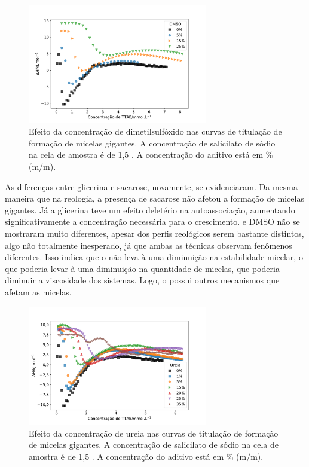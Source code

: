			\begin{figure}[h]
				\centering
				\includegraphics[width=0.7\textwidth]{imagens/itc/ITC_MG_dmso}
				\caption{Efeito da concentração de dimetilsulfóxido nas curvas de titulação de formação de micelas gigantes. A concentração de salicilato de sódio na cela de amostra é de 1,5 \mM. A concentração do aditivo está em \% (m/m).}
				\label{fig:itc_mg_dmso} 
			\end{figure}

			As diferenças entre glicerina e sacarose, novamente, se evidenciaram. Da mesma maneira que na reologia, a presença de sacarose não afetou a formação de micelas gigantes. Já a glicerina teve um efeito deletério na autoassociação, aumentando significativamente a concentração necessária para o crescimento. \BD{} e DMSO não se mostraram muito diferentes, apesar dos perfis reológicos serem bastante distintos, algo não totalmente inesperado, já que ambas as técnicas observam fenômenos diferentes. Isso indica que o \BD{} não leva à uma diminuição na estabilidade micelar, o que poderia levar à uma diminuição na quantidade de micelas, que poderia diminuir a viscosidade dos sistemas. Logo, o \BD{} possui outros mecanismos que afetam as micelas.

			\begin{figure}[h]
				\centering
				\includegraphics[width=0.7\textwidth]{imagens/itc/ITC_MG_ur}
				\caption{Efeito da concentração de ureia nas curvas de titulação de formação de micelas gigantes. A concentração de salicilato de sódio na cela de amostra é de 1,5 \mM. A concentração do aditivo está em \% (m/m).}
				\label{fig:itc_mg_ureia}
			\end{figure} 
		
